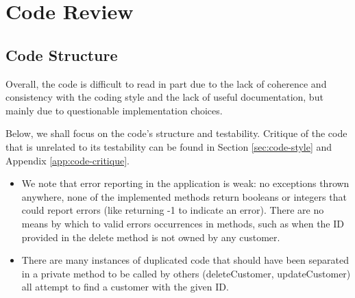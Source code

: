 \section{Code Review}


\subsection{Code Structure} 
\label{sec:code-structure}
Overall, the code is difficult to read in part due to the lack of coherence and consistency with the coding style and the lack of useful documentation, but mainly due to questionable implementation choices. 

Below, we shall focus on the code's structure and testability. Critique of the code that is unrelated to its testability can be found in Section \ref{sec:code-style} and Appendix \ref{app:code-critique}. 

\begin{itemize}
	\item We note that error reporting in the application is weak: no exceptions thrown anywhere, none of the implemented methods return booleans or integers that could report errors (like returning -1 to indicate an error). There are no means by which  to valid errors occurrences in methods, such as when the ID provided in the delete method is not owned by any customer. 
	\item There are many instances of duplicated code that should have been separated in a private method to be called by others (deleteCustomer, updateCustomer) all attempt to find a customer with the given ID. 
\end{itemize}


